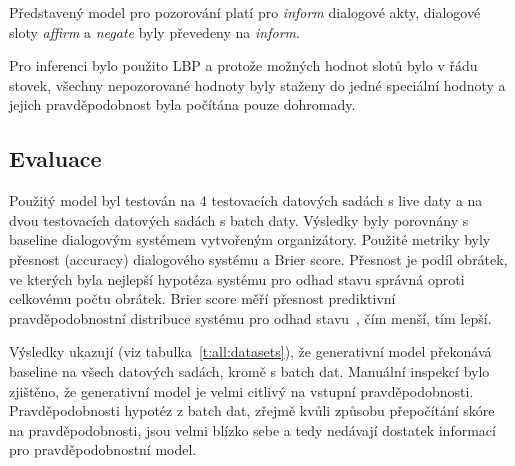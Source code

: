 Představený model pro pozorování platí pro \emph{inform} dialogové akty, dialogové sloty \emph{affirm} a \emph{negate} byly převedeny na \emph{inform}.

Pro inferenci bylo použito LBP a protože možných hodnot slotů bylo v řádu stovek, všechny nepozorované hodnoty byly staženy do jedné speciální hodnoty a jejich pravděpodobnost byla počítána pouze dohromady.

\subsection{Evaluace}

Použitý model byl testován na 4 testovacích datových sadách s live daty a na dvou testovacích datových sadách s batch daty.
Výsledky byly porovnány s baseline dialogovým systémem vytvořeným organizátory.
Použité metriky byly přesnost (accuracy) dialogového systému a Brier score.
Přesnost je podíl obrátek, ve kterých byla nejlepší hypotéza systému pro odhad stavu správná oproti celkovému počtu obrátek.
Brier score měří přesnost prediktivní pravděpodobnostní distribuce systému pro odhad stavu~\cite{brier1950verification}, čím menší, tím lepší.

Výsledky ukazují (viz tabulka~\ref{t:all:datasets}), že generativní model překonává baseline na všech datových sadách, kromě s batch dat.
Manuální inspekcí bylo zjištěno, že generativní model je velmi citlivý na vstupní pravděpodobnosti.
Pravděpodobnosti hypotéz z batch dat, zřejmě kvůli způsobu přepočítání skóre na pravděpodobnosti, jsou velmi blízko sebe a tedy nedávají dostatek informací pro pravděpodobnostní model.

